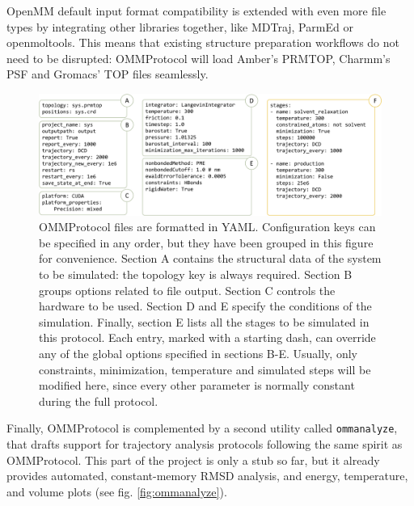 OpenMM default input format compatibility is extended with even more file types by integrating other libraries together, like MDTraj,\cite{mdtraj} ParmEd\cite{parmed} or openmoltools.\cite{openmoltools} This means that existing structure preparation workflows do not need to be disrupted: OMMProtocol will load Amber's PRMTOP, Charmm's PSF and Gromacs’ TOP files seamlessly.


\begin{figure}[H] %
	\begin{Center}
		\includegraphics[width=\textwidth]{./figures/05/ommprotocol-crop.pdf}
		\caption[OMMProtocol input file structure]{OMMProtocol files are formatted in YAML. Configuration keys can be specified in any order, but they have been grouped in this figure for convenience. Section A contains the structural data of the system to be simulated: the topology key is always required. Section B groups options related to file output. Section C controls the hardware to be used. Section D and E specify the conditions of the simulation. Finally, section E lists all the stages to be simulated in this protocol. Each entry, marked with a starting dash, can override any of the global options specified in sections B-E. Usually, only constraints, minimization, temperature and simulated steps will be modified here, since every other parameter is normally constant during the full protocol.}
		\label{fig:ommprotocol}
	\end{Center}
\end{figure}


Finally, OMMProtocol is complemented by a second utility called \texttt{ommanalyze}, that drafts support for trajectory analysis protocols following the same spirit as OMMProtocol. This part of the project is only a stub so far, but it already provides automated, constant-memory RMSD analysis, and energy, temperature, and volume plots (see fig. \ref{fig:ommanalyze}).



